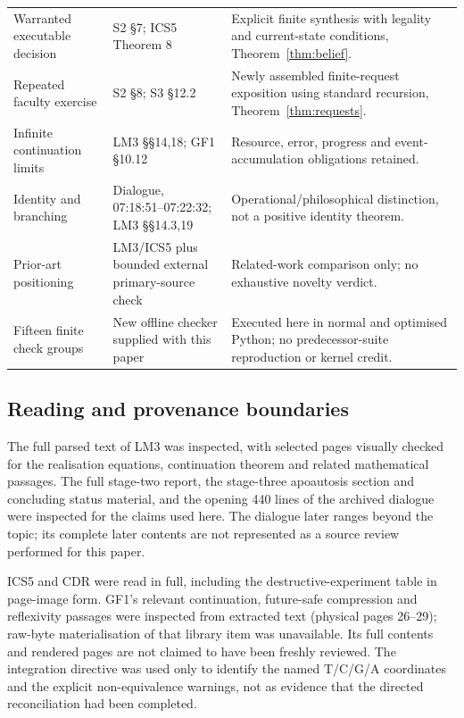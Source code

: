 \begin{longtable}{@{}p{.20\linewidth}p{.36\linewidth}p{.36\linewidth}@{}}
Warranted executable decision & S2 \S7; ICS5 Theorem 8 & Explicit finite synthesis with legality and current-state conditions, Theorem~\ref{thm:belief}.\\
Repeated faculty exercise & S2 \S8; S3 \S12.2 & Newly assembled finite-request exposition using standard recursion, Theorem~\ref{thm:requests}.\\
Infinite continuation limits & LM3 \S\S14,18; GF1 \S10.12 & Resource, error, progress and event-accumulation obligations retained.\\
Identity and branching & Dialogue, 07:18:51--07:22:32; LM3 \S\S14.3,19 & Operational/philosophical distinction, not a positive identity theorem.\\
Prior-art positioning & LM3/ICS5 plus bounded external primary-source check & Related-work comparison only; no exhaustive novelty verdict.\\
Fifteen finite check groups & New offline checker supplied with this paper & Executed here in normal and optimised Python; no predecessor-suite reproduction or kernel credit.\\
\bottomrule
\end{longtable}
\normalsize

\subsection*{Reading and provenance boundaries}

The full parsed text of LM3 was inspected, with selected pages visually checked for the realisation equations, continuation theorem and related mathematical passages. The full stage-two report, the stage-three apoautosis section and concluding status material, and the opening 440 lines of the archived dialogue were inspected for the claims used here. The dialogue later ranges beyond the topic; its complete later contents are not represented as a source review performed for this paper.

ICS5 and CDR were read in full, including the destructive-experiment table in page-image form. GF1's relevant continuation, future-safe compression and reflexivity passages were inspected from extracted text (physical pages 26--29); raw-byte materialisation of that library item was unavailable. Its full contents and rendered pages are not claimed to have been freshly reviewed. The integration directive was used only to identify the named T/C/G/A coordinates and the explicit non-equivalence warnings, not as evidence that the directed reconciliation had been completed.

